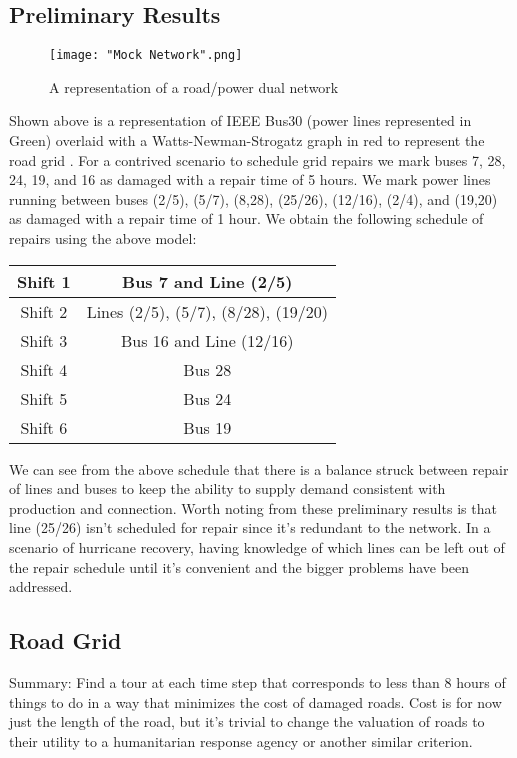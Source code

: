 \documentclass{article}
\begin{document}
	\subsection{Preliminary Results}
	\begin{figure}
	\texttt{[image: "Mock Network".png]}
	\caption{A representation of a road/power dual network}
	\end{figure}
	Shown above is a representation of IEEE Bus30 (power lines represented in Green) overlaid with a Watts-Newman-Strogatz graph in red to represent the road grid \cite{NewmanEA2001}. For a contrived scenario to schedule grid repairs we mark buses 7, 28, 24, 19, and 16 as damaged with a repair time of 5 hours. We mark power lines running between buses (2/5), (5/7), (8,28), (25/26), (12/16), (2/4), and (19,20) as damaged with a repair time of 1 hour. We obtain the following schedule of repairs using the above model:
	\newline
	\begin{tabular}{|c|c|}
		\hline
		Shift 1 & Bus 7 and Line (2/5) \\
		\hline
		Shift 2 & Lines (2/5), (5/7), (8/28), (19/20) \\
		\hline
		Shift 3 & Bus 16 and Line (12/16) \\
		\hline
		Shift 4 & Bus 28 \\
		\hline
		Shift 5 & Bus 24 \\
		\hline
		Shift 6 & Bus 19 \\
		\hline
	\end{tabular}
	\newline
	
	We can see from the above schedule that there is a balance struck between repair of lines and buses to keep the ability to supply demand consistent with production and connection. Worth noting from these preliminary results is that line (25/26) isn't scheduled for repair since it's redundant to the network. In a scenario of hurricane recovery, having knowledge of which lines can be left out of the repair schedule until it's convenient and the bigger problems have been addressed. 
	  
	\subsection{Road Grid}
	Summary: Find a tour at each time step that corresponds to less than 8 hours of things to do in a way that minimizes the cost of damaged roads. Cost is for now just the length of the road, but it's trivial to change the valuation of roads to their utility to a humanitarian response agency or another similar criterion.
\end{document}
